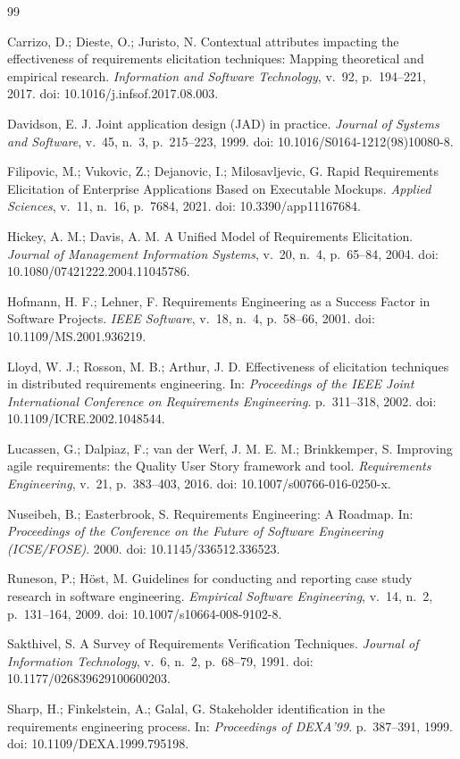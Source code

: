 ﻿\documentclass[12pt]{article}
\begin{document}
\begin{thebibliography}{99}

Carrizo, D.; Dieste, O.; Juristo, N. Contextual attributes impacting the effectiveness of requirements elicitation techniques: Mapping theoretical and empirical research. \textit{Information and Software Technology}, v.~92, p.~194--221, 2017. doi: 10.1016/j.infsof.2017.08.003.

Davidson, E. J. Joint application design (JAD) in practice. \textit{Journal of Systems and Software}, v.~45, n.~3, p.~215--223, 1999. doi: 10.1016/S0164-1212(98)10080-8.

Filipovic, M.; Vukovic, Z.; Dejanovic, I.; Milosavljevic, G. Rapid Requirements Elicitation of Enterprise Applications Based on Executable Mockups. \textit{Applied Sciences}, v.~11, n.~16, p.~7684, 2021. doi: 10.3390/app11167684.

Hickey, A. M.; Davis, A. M. A Unified Model of Requirements Elicitation. \textit{Journal of Management Information Systems}, v.~20, n.~4, p.~65--84, 2004. doi: 10.1080/07421222.2004.11045786.

Hofmann, H. F.; Lehner, F. Requirements Engineering as a Success Factor in Software Projects. \textit{IEEE Software}, v.~18, n.~4, p.~58--66, 2001. doi: 10.1109/MS.2001.936219.

Lloyd, W. J.; Rosson, M. B.; Arthur, J. D. Effectiveness of elicitation techniques in distributed requirements engineering. In: \textit{Proceedings of the IEEE Joint International Conference on Requirements Engineering}. p.~311--318, 2002. doi: 10.1109/ICRE.2002.1048544.

Lucassen, G.; Dalpiaz, F.; van der Werf, J. M. E. M.; Brinkkemper, S. Improving agile requirements: the Quality User Story framework and tool. \textit{Requirements Engineering}, v.~21, p.~383--403, 2016. doi: 10.1007/s00766-016-0250-x.

Nuseibeh, B.; Easterbrook, S. Requirements Engineering: A Roadmap. In: \textit{Proceedings of the Conference on the Future of Software Engineering (ICSE/FOSE)}. 2000. doi: 10.1145/336512.336523.

Runeson, P.; H{\"o}st, M. Guidelines for conducting and reporting case study research in software engineering. \textit{Empirical Software Engineering}, v.~14, n.~2, p.~131--164, 2009. doi: 10.1007/s10664-008-9102-8.

Sakthivel, S. A Survey of Requirements Verification Techniques. \textit{Journal of Information Technology}, v.~6, n.~2, p.~68--79, 1991. doi: 10.1177/026839629100600203.

Sharp, H.; Finkelstein, A.; Galal, G. Stakeholder identification in the requirements engineering process. In: \textit{Proceedings of DEXA'99}. p.~387--391, 1999. doi: 10.1109/DEXA.1999.795198.

\end{thebibliography}
\end{document}
